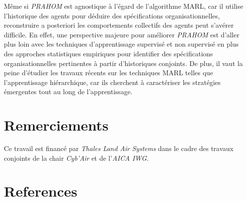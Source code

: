 \documentclass[contribution]{jfsma}
\begin{document}
Même si \emph{PRAHOM} est agnostique à l'égard de l'algorithme MARL, car il utilise l'historique des agents pour déduire des spécifications organisationnelles, reconstruire a posteriori les comportements collectifs des agents peut s'avérer difficile. En effet, une perspective majeure pour améliorer \emph{PRAHOM} est d'aller plus loin avec les techniques d'apprentissage supervisé et non supervisé en plus des approches statistiques empiriques pour identifier des spécifications organisationnelles pertinentes à partir d'historiques conjoints. De plus, il vaut la peine d’étudier les travaux récents sur les techniques MARL telles que l’apprentissage hiérarchique, car ils cherchent  à caractériser les stratégies émergentes tout au long de l’apprentissage.



\section*{Remerciements}

Ce travail est financé par \emph{Thales Land Air Systems} dans le cadre des travaux conjoints de la chair \emph{Cyb'Air} et de l'\emph{AICA IWG}.

\section*{References}
\small


\end{document}
